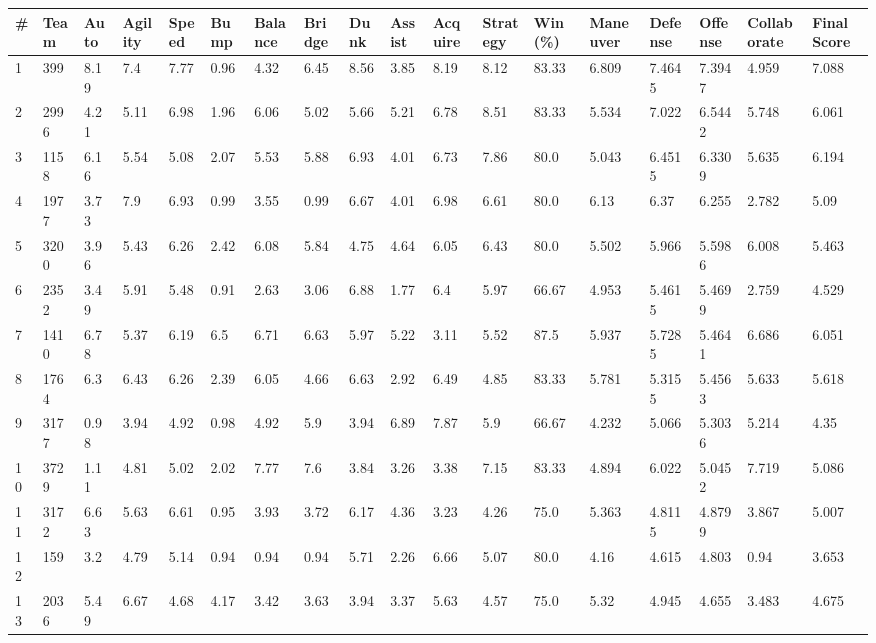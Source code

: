 \documentclass[landscape, 10pt]{report}
\begin{document}
\begin{longtable}{l || l || l | l | l | l | l | l | l | l | l | l | l || l | l | l | l | l} 
\# & Team & Auto & Agility & Speed & Bump & Balance & Bridge & Dunk & Assist & Acquire & Strategy & Win (\%) & Maneuver & Defense & Offense & Collaborate & Final Score \\ \hline \endhead 
\rowcolor{lightgray}1 & 399 & 8.19 & 7.4 & 7.77 & 0.96 & 4.32 & 6.45 & 8.56 & 3.85 & 8.19 & 8.12 & 83.33 & 6.809 & 7.4645 & 7.3947 & 4.959 & 7.088\\ 
2 & 2996 & 4.21 & 5.11 & 6.98 & 1.96 & 6.06 & 5.02 & 5.66 & 5.21 & 6.78 & 8.51 & 83.33 & 5.534 & 7.022 & 6.5442 & 5.748 & 6.061\\ 
\rowcolor{lightgray}3 & 1158 & 6.16 & 5.54 & 5.08 & 2.07 & 5.53 & 5.88 & 6.93 & 4.01 & 6.73 & 7.86 & 80.0 & 5.043 & 6.4515 & 6.3309 & 5.635 & 6.194\\ 
4 & 1977 & 3.73 & 7.9 & 6.93 & 0.99 & 3.55 & 0.99 & 6.67 & 4.01 & 6.98 & 6.61 & 80.0 & 6.13 & 6.37 & 6.255 & 2.782 & 5.09\\ 
\rowcolor{lightgray}5 & 3200 & 3.96 & 5.43 & 6.26 & 2.42 & 6.08 & 5.84 & 4.75 & 4.64 & 6.05 & 6.43 & 80.0 & 5.502 & 5.966 & 5.5986 & 6.008 & 5.463\\ 
6 & 2352 & 3.49 & 5.91 & 5.48 & 0.91 & 2.63 & 3.06 & 6.88 & 1.77 & 6.4 & 5.97 & 66.67 & 4.953 & 5.4615 & 5.4699 & 2.759 & 4.529\\ 
\rowcolor{lightgray}7 & 1410 & 6.78 & 5.37 & 6.19 & 6.5 & 6.71 & 6.63 & 5.97 & 5.22 & 3.11 & 5.52 & 87.5 & 5.937 & 5.7285 & 5.4641 & 6.686 & 6.051\\ 
8 & 1764 & 6.3 & 6.43 & 6.26 & 2.39 & 6.05 & 4.66 & 6.63 & 2.92 & 6.49 & 4.85 & 83.33 & 5.781 & 5.3155 & 5.4563 & 5.633 & 5.618\\ 
\rowcolor{lightgray}9 & 3177 & 0.98 & 3.94 & 4.92 & 0.98 & 4.92 & 5.9 & 3.94 & 6.89 & 7.87 & 5.9 & 66.67 & 4.232 & 5.066 & 5.3036 & 5.214 & 4.35\\ 
10 & 3729 & 1.11 & 4.81 & 5.02 & 2.02 & 7.77 & 7.6 & 3.84 & 3.26 & 3.38 & 7.15 & 83.33 & 4.894 & 6.022 & 5.0452 & 7.719 & 5.086\\ 
\rowcolor{lightgray}11 & 3172 & 6.63 & 5.63 & 6.61 & 0.95 & 3.93 & 3.72 & 6.17 & 4.36 & 3.23 & 4.26 & 75.0 & 5.363 & 4.8115 & 4.8799 & 3.867 & 5.007\\ 
12 & 159 & 3.2 & 4.79 & 5.14 & 0.94 & 0.94 & 0.94 & 5.71 & 2.26 & 6.66 & 5.07 & 80.0 & 4.16 & 4.615 & 4.803 & 0.94 & 3.653\\ 
\rowcolor{lightgray}13 & 2036 & 5.49 & 6.67 & 4.68 & 4.17 & 3.42 & 3.63 & 3.94 & 3.37 & 5.63 & 4.57 & 75.0 & 5.32 & 4.945 & 4.655 & 3.483 & 4.675\\ 

\end{longtable}
\end{document}
